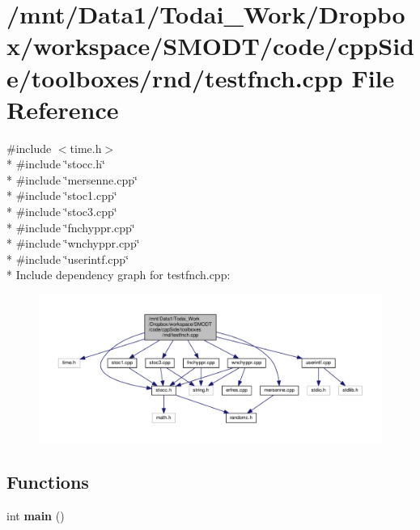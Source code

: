 \section{/mnt/\-Data1/\-Todai\-\_\-\-Work/\-Dropbox/workspace/\-S\-M\-O\-D\-T/code/cpp\-Side/toolboxes/rnd/testfnch.cpp File Reference}
\label{toolboxes_2rnd_2testfnch_8cpp}
{\ttfamily \#include $<$time.\-h$>$}\\*
{\ttfamily \#include \char`\"{}stocc.\-h\char`\"{}}\\*
{\ttfamily \#include \char`\"{}mersenne.\-cpp\char`\"{}}\\*
{\ttfamily \#include \char`\"{}stoc1.\-cpp\char`\"{}}\\*
{\ttfamily \#include \char`\"{}stoc3.\-cpp\char`\"{}}\\*
{\ttfamily \#include \char`\"{}fnchyppr.\-cpp\char`\"{}}\\*
{\ttfamily \#include \char`\"{}wnchyppr.\-cpp\char`\"{}}\\*
{\ttfamily \#include \char`\"{}userintf.\-cpp\char`\"{}}\\*
Include dependency graph for testfnch.\-cpp\-:\nopagebreak
\begin{figure}[H]
\begin{center}
\leavevmode
\includegraphics[width=350pt]{toolboxes_2rnd_2testfnch_8cpp__incl}
\end{center}
\end{figure}
\subsection*{Functions}
\begin{DoxyCompactItemize}
\item 
int {\bf main} ()
\end{DoxyCompactItemize}


